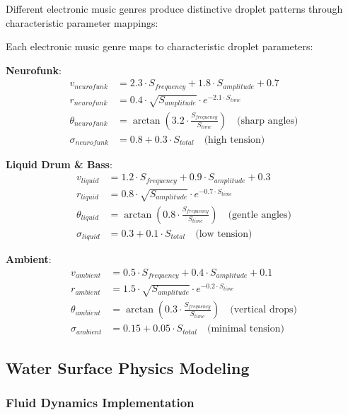 Different electronic music genres produce distinctive droplet patterns through characteristic parameter mappings:

\begin{definition}
Each electronic music genre maps to characteristic droplet parameters:

\textbf{Neurofunk}:
\begin{align}
v_{neurofunk} &= 2.3 \cdot S_{frequency} + 1.8 \cdot S_{amplitude} + 0.7 \\
r_{neurofunk} &= 0.4 \cdot \sqrt{S_{amplitude}} \cdot e^{-2.1 \cdot S_{time}} \\
\theta_{neurofunk} &= \arctan(3.2 \cdot \frac{S_{frequency}}{S_{time}}) \quad \text{(sharp angles)} \\
\sigma_{neurofunk} &= 0.8 + 0.3 \cdot S_{total} \quad \text{(high tension)}
\end{align}

\textbf{Liquid Drum \& Bass}:
\begin{align}
v_{liquid} &= 1.2 \cdot S_{frequency} + 0.9 \cdot S_{amplitude} + 0.3 \\
r_{liquid} &= 0.8 \cdot \sqrt{S_{amplitude}} \cdot e^{-0.7 \cdot S_{time}} \\
\theta_{liquid} &= \arctan(0.8 \cdot \frac{S_{frequency}}{S_{time}}) \quad \text{(gentle angles)} \\
\sigma_{liquid} &= 0.3 + 0.1 \cdot S_{total} \quad \text{(low tension)}
\end{align}

\textbf{Ambient}:
\begin{align}
v_{ambient} &= 0.5 \cdot S_{frequency} + 0.4 \cdot S_{amplitude} + 0.1 \\
r_{ambient} &= 1.5 \cdot \sqrt{S_{amplitude}} \cdot e^{-0.2 \cdot S_{time}} \\
\theta_{ambient} &= \arctan(0.3 \cdot \frac{S_{frequency}}{S_{time}}) \quad \text{(vertical drops)} \\
\sigma_{ambient} &= 0.15 + 0.05 \cdot S_{total} \quad \text{(minimal tension)}
\end{align}
\end{definition}

\subsection{Water Surface Physics Modeling}

\subsubsection{Fluid Dynamics Implementation}

